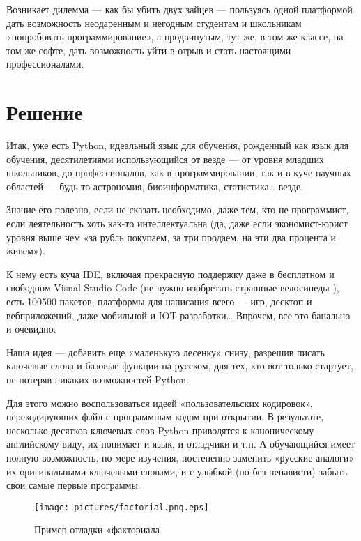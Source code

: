 ﻿\documentclass[a4paper,12pt]{article}
\begin{document}
Возникает дилемма --- как бы убить двух зайцев --- пользуясь одной
платформой дать возможность неодаренным и негодным
студентам и школьникам \cite{students-sucks} «попробовать программирование», а продвинутым,
тут же, в том же классе, на том же софте, дать возможность уйти в отрыв
и стать настоящими профессионалами.

\section{Решение}

Итак, уже есть Python, идеальный язык для обучения, рожденный как язык
для обучения, десятилетиями использующийся от везде --- от уровня
младших школьников, до профессионалов, как в программировании, так и в
куче научных областей --- будь то астрономия, биоинформатика,
статистика\ldots{} везде.

Знание его полезно, если не сказать необходимо, даже тем, кто не
программист, если деятельность хоть как-то интеллектуальна (да, даже
если экономист-юрист уровня выше чем «за рубль покупаем, за три продаем,
на эти два процента и живем»).

К нему есть куча IDE, включая прекрасную поддержку даже в бесплатном и
свободном Visual Studio Code (не нужно
изобретать страшные велосипеды \cite{ide-python}), есть
100500 пакетов, платформы для написания всего --- игр, десктоп и
вебприложений, даже мобильной и IOT разработки\ldots{} Впрочем, все это
банально и очевидно.
 
Наша идея \cite{python-udaff} --- добавить еще «маленькую лесенку» снизу, разрешив писать
ключевые слова и базовые функции на русском, для тех, кто вот только
стартует, не потеряв никаких возможностей Python.

Для этого можно воспользоваться идеей «пользовательских кодировок»,
перекодирующих файл с программным кодом при открытии. В результате,
несколько десятков ключевых слов Python приводятся к каноническому
английскому виду, их понимает и язык, и отладчики и т.п. А обучающийся
имеет полную возможность, по мере изучения, постепенно заменить «русские
аналоги» их оригинальными ключевыми словами, и с улыбкой (но без
ненависти) забыть свои самые первые программы.

\begin{figure}
\centering
\texttt{[image: pictures/factorial.png.eps]}
\caption{Пример отладки «факториала}
\end{figure}
\end{document}
